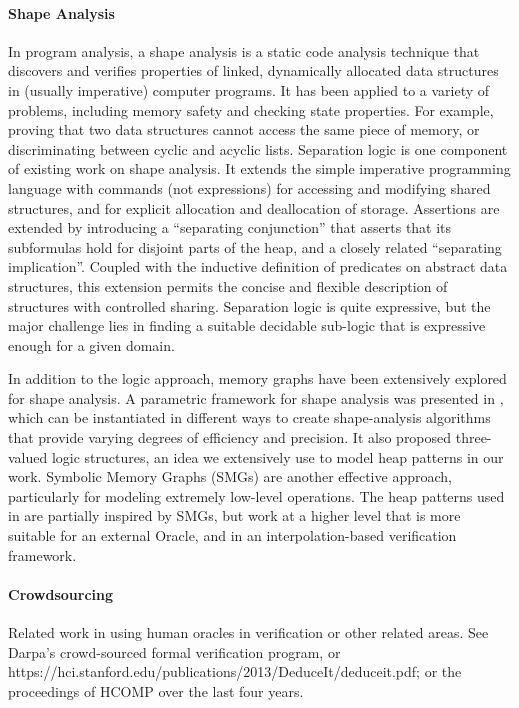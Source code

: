\paragraph{Shape Analysis}
In program analysis, a shape analysis is a static code analysis technique that discovers and verifies properties of linked, dynamically allocated data structures in (usually imperative) computer programs. It has been applied to a variety of problems, including memory safety and checking state properties. For example, proving that two data structures cannot access the same piece of memory, or discriminating between cyclic and acyclic lists. Separation logic \cite{calcagano11,reynolds02} is one component of existing work on shape analysis. It extends the simple imperative programming language with commands (not expressions) for accessing and modifying shared structures, and for explicit allocation and deallocation of storage. Assertions are extended by introducing a ``separating conjunction'' that asserts that its subformulas hold for disjoint parts of the heap, and a closely related ``separating implication''. Coupled with the inductive definition of predicates on abstract data structures, this extension permits the concise and flexible description of
structures with controlled sharing. Separation logic is quite expressive, but the major challenge lies in finding a suitable decidable sub-logic that is expressive enough for a given domain.

In addition to the logic approach, memory graphs have been extensively explored for shape analysis. A parametric framework for shape analysis was presented in \cite{sagiv02}, which can be instantiated in different ways to create shape-analysis algorithms that provide varying degrees of efficiency and precision. It also proposed three-valued logic structures, an idea we extensively use to model heap patterns in our work. Symbolic Memory Graphs (SMGs) \cite{dudka13} are another effective approach, particularly for modeling extremely low-level operations. The heap patterns used in \verifier are partially inspired by SMGs, but work at a higher level that is more suitable for an external Oracle, and in an interpolation-based verification framework.

\paragraph{Crowdsourcing}
Related work in using human oracles in verification or other related areas. See Darpa's crowd-sourced formal verification program, or https://hci.stanford.edu/publications/2013/DeduceIt/deduceit.pdf; or the proceedings of HCOMP over the last four years. \cite{wenchao2012, verigames, eyewire}

